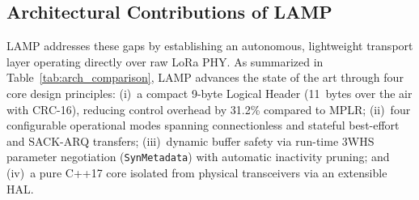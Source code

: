 \documentclass[journal]{IEEEtran}
\begin{document}
\subsection{Architectural Contributions of LAMP}
\ac{LAMP} addresses these gaps by establishing an autonomous, lightweight transport layer operating directly over raw \ac{LoRa} PHY. As summarized in Table~\ref{tab:arch_comparison}, \ac{LAMP} advances the state of the art through four core design principles: (i)~a compact 9-byte Logical Header (11~bytes over the air with CRC-16), reducing control overhead by 31.2\% compared to MPLR; (ii)~four configurable operational modes spanning connectionless and stateful best-effort and SACK-ARQ transfers; (iii)~dynamic buffer safety via run-time \ac{3WHS} parameter negotiation (\texttt{SynMetadata}) with automatic inactivity pruning; and (iv)~a pure C++17 core isolated from physical transceivers via an extensible \ac{HAL}.
\end{document}

